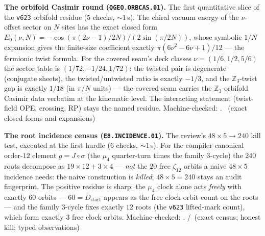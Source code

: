 \documentclass[11pt,a4paper]{article}
\theoremstyle{definition}
\begin{document}
\par\smallskip\noindent\textbf{The orbifold Casimir round
(\texttt{QGEO.ORBCAS.01}).}
The first quantitative slice of the \texttt{v623} orbifold residue
($5$ checks, ${\sim}1$\,s).  The chiral vacuum energy of the
$\nu$-offset sector on $N$ sites has the exact closed form
$E_0(\nu,N)=-\cos(\pi(2\nu{-}1)/2N)/(2\sin(\pi/2N))$, whose symbolic
$1/N$ expansion gives the finite-size coefficient exactly
$\pi(6\nu^2{-}6\nu{+}1)/12$ --- the fermionic twist formula.  For the
covered seam's deck classes $\nu=(1/6,1/2,5/6)$ the sector table is
$(1/72,-1/24,1/72)$: the twisted pair is degenerate (conjugate
sheets), the twisted/untwisted ratio is exactly $-1/3$, and the
$\mathbb Z_3$-twist gap is exactly $1/18$ (in $\pi/N$ units) --- the
covered seam carries the $\mathbb Z_3$-orbifold Casimir data
verbatim at the kinematic level.  The interacting statement
(twist-field OPE, crossing, RP) stays the named residue.
Machine-checked: .
\mE\ (exact closed forms and expansions)
\par\smallskip

\par\smallskip\noindent\textbf{The root incidence census
(\texttt{E8.INCIDENCE.01}).}
The review's $48\times5\to240$ kill test, executed at the first hurdle
($6$ checks, ${\sim}1$\,s).  For the compiler-canonical order-$12$
element $g=J\circ\sigma$ (the $\mu_4$ quarter-turn times the family
$3$-cycle) the $240$ roots decompose as $19\times12+3\times4$ ---
\emph{not} the $20$ free $\zeta_{12}$ orbits a naive
$48\times5$ incidence needs: the naive construction is
\emph{killed}; $48\times5=240$ stays an audit fingerprint.  The
positive residue is sharp: the $\mu_4$ clock alone acts \emph{freely}
with exactly $60$ orbits --- $60=D_{\mathrm{start}}$ appears as the
free clock-orbit count on the roots --- and the family $3$-cycle fixes
exactly $12$ roots (the \texttt{v623} lifted-mark count), which form
exactly $3$ free clock orbits.
Machine-checked: .
\mE/\mC\ (exact census; honest kill; typed observations)
\par\smallskip
\end{document}
